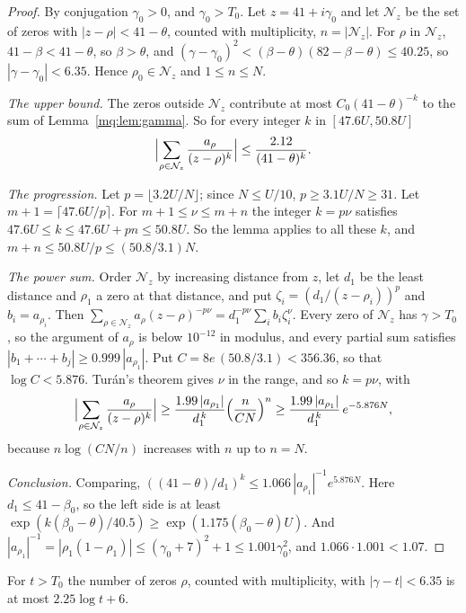 \begin{proof}
By conjugation $\gamma_0>0$, and $\gamma_0>T_0$. Let $z=41+i\gamma_0$ and let $\mathcal N_z$ be the set of zeros with $|z-\rho|<41-\theta$, counted with multiplicity, $n=|\mathcal N_z|$. For $\rho$ in $\mathcal N_z$, $41-\beta<41-\theta$, so $\beta>\theta$, and $(\gamma-\gamma_0)^2<(\beta-\theta)(82-\beta-\theta)\le40.25$, so $|\gamma-\gamma_0|<6.35$. Hence $\rho_0\in\mathcal N_z$ and $1\le n\le N$.

\emph{The upper bound.} The zeros outside $\mathcal N_z$ contribute at most $C_0(41-\theta)^{-k}$ to the sum of Lemma~\ref{mq:lem:gamma}. So for every integer $k$ in $[47.6U,50.8U]$
\[
\Bigl|\sum_{\rho\in\mathcal N_z}\frac{a_\rho}{(z-\rho)^k}\Bigr|\le\frac{2.12}{(41-\theta)^k}.
\]

\emph{The progression.} Let $p=\lfloor3.2U/N\rfloor$; since $N\le U/10$, $p\ge3.1U/N\ge31$. Let $m+1=\lceil47.6U/p\rceil$. For $m+1\le\nu\le m+n$ the integer $k=p\nu$ satisfies $47.6U\le k\le47.6U+pn\le50.8U$. So the lemma applies to all these $k$, and $m+n\le50.8U/p\le(50.8/3.1)N$.

\emph{The power sum.} Order $\mathcal N_z$ by increasing distance from $z$, let $d_1$ be the least distance and $\rho_1$ a zero at that distance, and put $\zeta_i=(d_1/(z-\rho_i))^p$ and $b_i=a_{\rho_i}$. Then $\sum_{\rho\in\mathcal N_z}a_\rho(z-\rho)^{-p\nu}=d_1^{-p\nu}\sum_ib_i\zeta_i^\nu$. Every zero of $\mathcal N_z$ has $\gamma>T_0$, so the argument of $a_\rho$ is below $10^{-12}$ in modulus, and every partial sum satisfies $|b_1+\cdots+b_j|\ge0.999\,|a_{\rho_1}|$. Put $C=8e\,(50.8/3.1)<356.36$, so that $\log C<5.876$. Tur\'an's theorem gives $\nu$ in the range, and so $k=p\nu$, with
\[
\Bigl|\sum_{\rho\in\mathcal N_z}\frac{a_\rho}{(z-\rho)^k}\Bigr|\ge\frac{1.99\,|a_{\rho_1}|}{d_1^{\,k}}\Bigl(\frac n{CN}\Bigr)^n\ge\frac{1.99\,|a_{\rho_1}|}{d_1^{\,k}}\,e^{-5.876N},
\]
because $n\log(CN/n)$ increases with $n$ up to $n=N$.

\emph{Conclusion.} Comparing, $((41-\theta)/d_1)^k\le1.066\,|a_{\rho_1}|^{-1}e^{5.876N}$. Here $d_1\le41-\beta_0$, so the left side is at least $\exp(k(\beta_0-\theta)/40.5)\ge\exp(1.175(\beta_0-\theta)U)$. And $|a_{\rho_1}|^{-1}=|\rho_1(1-\rho_1)|\le(\gamma_0+7)^2+1\le1.001\gamma_0^2$, and $1.066\cdot1.001<1.07$.
\end{proof}

\begin{lemma}\label{mq:lem:count}
For $t>T_0$ the number of zeros $\rho$, counted with multiplicity, with $|\gamma-t|<6.35$ is at most $2.25\log t+6$.
\end{lemma}

